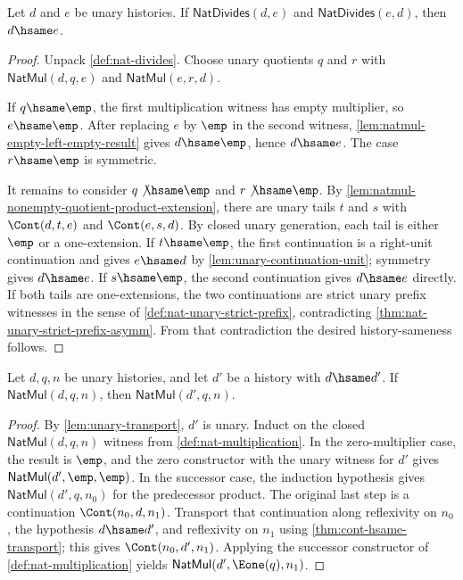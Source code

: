 \begin{theorem}
\label{thm:nat-divides-antisymmetry-hsame}
Let $d$ and $e$ be unary histories. If $\mathsf{NatDivides}(d,e)$ and $\mathsf{NatDivides}(e,d)$, then $d\hsame e$.
\end{theorem}
\begin{proof}
Unpack \autoref{def:nat-divides}. Choose unary quotients $q$ and $r$ with $\mathsf{NatMul}(d,q,e)$ and $\mathsf{NatMul}(e,r,d)$.

If $q\hsame\emp$, the first multiplication witness has empty multiplier, so $e\hsame\emp$. After replacing $e$ by $\emp$ in the second witness, \autoref{lem:natmul-empty-left-empty-result} gives $d\hsame\emp$, hence $d\hsame e$. The case $r\hsame\emp$ is symmetric.

It remains to consider $q\not\hsame\emp$ and $r\not\hsame\emp$. By \autoref{lem:natmul-nonempty-quotient-product-extension}, there are unary tails $t$ and $s$ with $\Cont(d,t,e)$ and $\Cont(e,s,d)$. By closed unary generation, each tail is either $\emp$ or a one-extension. If $t\hsame\emp$, the first continuation is a right-unit continuation and gives $e\hsame d$ by \autoref{lem:unary-continuation-unit}; symmetry gives $d\hsame e$. If $s\hsame\emp$, the second continuation gives $d\hsame e$ directly. If both tails are one-extensions, the two continuations are strict unary prefix witnesses in the sense of \autoref{def:nat-unary-strict-prefix}, contradicting \autoref{thm:nat-unary-strict-prefix-asymm}. From that contradiction the desired history-sameness follows.
\end{proof}

\begin{lemma}
\label{lem:nat-mul-multiplicand-hsame-transport}
Let $d,q,n$ be unary histories, and let $d'$ be a history with $d\hsame d'$. If $\mathsf{NatMul}(d,q,n)$, then $\mathsf{NatMul}(d',q,n)$.
\end{lemma}
\begin{proof}
By \autoref{lem:unary-transport}, $d'$ is unary. Induct on the closed $\mathsf{NatMul}(d,q,n)$ witness from \autoref{def:nat-multiplication}. In the zero-multiplier case, the result is $\emp$, and the zero constructor with the unary witness for $d'$ gives $\mathsf{NatMul}(d',\emp,\emp)$. In the successor case, the induction hypothesis gives $\mathsf{NatMul}(d',q,n_0)$ for the predecessor product. The original last step is a continuation $\Cont(n_0,d,n_1)$. Transport that continuation along reflexivity on $n_0$, the hypothesis $d\hsame d'$, and reflexivity on $n_1$ using \autoref{thm:cont-hsame-transport}; this gives $\Cont(n_0,d',n_1)$. Applying the successor constructor of \autoref{def:nat-multiplication} yields $\mathsf{NatMul}(d',\Eone(q),n_1)$.
\end{proof}

